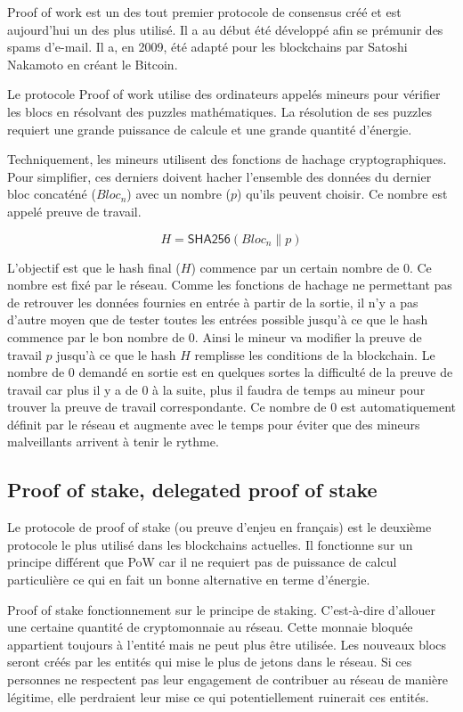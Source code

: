 Proof of work est un des tout premier protocole de consensus créé et est aujourd'hui un des plus utilisé. Il a au début été développé afin se prémunir des spams d'e-mail. Il a, en 2009, été adapté pour les blockchains par Satoshi Nakamoto en créant le Bitcoin.

Le protocole Proof of work utilise des ordinateurs appelés mineurs pour vérifier les blocs en résolvant des puzzles mathématiques. La résolution de ses puzzles requiert une grande puissance de calcule et une grande quantité d'énergie.

Techniquement, les mineurs utilisent des fonctions de hachage cryptographiques. Pour simplifier, ces derniers doivent hacher l'ensemble des données du dernier bloc concaténé ($Bloc_n$) avec un nombre ($p$) qu'ils peuvent choisir. Ce nombre est appelé preuve de travail.

\begin{equation*}
    H = \textsf{SHA256}(Bloc_{n} \| p)
\end{equation*}

L'objectif est que le hash final ($H$) commence par un certain nombre de 0. Ce nombre est fixé par le réseau. Comme les fonctions de hachage ne permettant pas de retrouver les données fournies en entrée à partir de la sortie, il n'y a pas d'autre moyen que de tester toutes les entrées possible jusqu'à ce que le hash commence par le bon nombre de 0. Ainsi le mineur va modifier la preuve de travail $p$ jusqu'à ce que le hash $H$ remplisse les conditions de la blockchain. Le nombre de 0 demandé en sortie est en quelques sortes la difficulté de la preuve de travail car plus il y a de 0 à la suite, plus il faudra de temps au mineur pour trouver la preuve de travail correspondante. Ce nombre de 0 est automatiquement définit par le réseau et augmente avec le temps pour éviter que des mineurs malveillants arrivent à tenir le rythme.

\subsection{Proof of stake, delegated proof of stake}

Le protocole de proof of stake (ou preuve d'enjeu en français) est le deuxième protocole le plus utilisé dans les blockchains actuelles. Il fonctionne sur un principe différent que PoW car il ne requiert pas de puissance de calcul particulière ce qui en fait un bonne alternative en terme d'énergie.

Proof of stake fonctionnement sur le principe de staking. C'est-à-dire d'allouer une certaine quantité de cryptomonnaie au réseau. Cette monnaie bloquée appartient toujours à l'entité mais ne peut plus être utilisée. Les nouveaux blocs seront créés par les entités qui mise le plus de jetons dans le réseau. Si ces personnes ne respectent pas leur engagement de contribuer au réseau de manière légitime, elle perdraient leur mise ce qui potentiellement ruinerait ces entités. 

